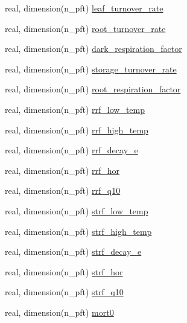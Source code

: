 \begin{DoxyCompactItemize}
\item 
real, dimension(n\+\_\+pft) \hyperlink{namespacepft__coms_a3c2cfe5a5095b3617d6ef0eda3088d07}{leaf\+\_\+turnover\+\_\+rate}
\item 
real, dimension(n\+\_\+pft) \hyperlink{namespacepft__coms_a99860b135721c9298c4a28c8eeaab425}{root\+\_\+turnover\+\_\+rate}
\item 
real, dimension(n\+\_\+pft) \hyperlink{namespacepft__coms_acd493e3e4371571956c651698a6462b9}{dark\+\_\+respiration\+\_\+factor}
\item 
real, dimension(n\+\_\+pft) \hyperlink{namespacepft__coms_ac6e0048b175e1bdd410e60c25eddd828}{storage\+\_\+turnover\+\_\+rate}
\item 
real, dimension(n\+\_\+pft) \hyperlink{namespacepft__coms_a3bc4fe17b80e40b1224d3e46d9699a66}{root\+\_\+respiration\+\_\+factor}
\item 
real, dimension(n\+\_\+pft) \hyperlink{namespacepft__coms_a87bba89213b158e2aed4dac23565b3d6}{rrf\+\_\+low\+\_\+temp}
\item 
real, dimension(n\+\_\+pft) \hyperlink{namespacepft__coms_ae05300b2ffecef7671154f099c69e0bb}{rrf\+\_\+high\+\_\+temp}
\item 
real, dimension(n\+\_\+pft) \hyperlink{namespacepft__coms_a2087ec09afb37705591b08017b2bcb27}{rrf\+\_\+decay\+\_\+e}
\item 
real, dimension(n\+\_\+pft) \hyperlink{namespacepft__coms_a5fc24fd1652202216904fe39f1a2f318}{rrf\+\_\+hor}
\item 
real, dimension(n\+\_\+pft) \hyperlink{namespacepft__coms_aadcb3d9b31b09de0ee92c5c0d549ce28}{rrf\+\_\+q10}
\item 
real, dimension(n\+\_\+pft) \hyperlink{namespacepft__coms_a1e68af5e117a86b34f515771b0aa4b37}{strf\+\_\+low\+\_\+temp}
\item 
real, dimension(n\+\_\+pft) \hyperlink{namespacepft__coms_a065e5f350ad9ac77d9a66c7486268fb8}{strf\+\_\+high\+\_\+temp}
\item 
real, dimension(n\+\_\+pft) \hyperlink{namespacepft__coms_a5cfdb0129f160897b6cc37536a67cfc5}{strf\+\_\+decay\+\_\+e}
\item 
real, dimension(n\+\_\+pft) \hyperlink{namespacepft__coms_a7ef86f21ed213453006c76ac60401a75}{strf\+\_\+hor}
\item 
real, dimension(n\+\_\+pft) \hyperlink{namespacepft__coms_ab74ac70bc631850f0b352ce40c565acb}{strf\+\_\+q10}
\item 
real, dimension(n\+\_\+pft) \hyperlink{namespacepft__coms_a70607e766522bb0ddd5329aa60d6b5e7}{mort0}

\end{DoxyCompactItemize}
